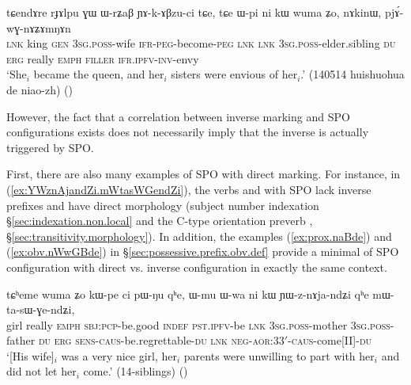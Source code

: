  \begin{exe}
\ex \label{ex:pjAwGnAZAmNAn}
 \gll tɕendɤre rɟɤlpu ɣɯ ɯ-rʑaβ ɲɤ-k-ɤβzu-ci tɕe, tɕe ɯ-pi ni kɯ wuma ʑo, nɤkinɯ, pjɤ́-wɣ-nɤʑɤmŋɤn \\
\textsc{lnk} king \textsc{gen} \textsc{3sg}.\textsc{poss}-wife \textsc{ifr}-\textsc{peg}-become-\textsc{peg} \textsc{lnk} \textsc{lnk} \textsc{3sg}.\textsc{poss}-elder.sibling \textsc{du} \textsc{erg} really \textsc{emph} \textsc{filler} \textsc{ifr}.\textsc{ipfv}-\textsc{inv}-envy \\
\glt `She$_i$ became the queen, and her$_i$ sisters were envious of her$_i$.' (140514 huishuohua de niao-zh)
()
\end{exe}

However, the fact that a correlation between inverse marking and SPO configurations exists does not necessarily imply that the inverse is actually triggered by SPO. 

First, there are also many examples of SPO with direct marking. For instance, in (\ref{ex:YWznAjandZi.mWtasWGendZi}), the verbs  and  with SPO lack inverse prefixes and have direct morphology (subject number indexation §\ref{sec:indexation.non.local} and the C-type orientation preverb , §\ref{sec:transitivity.morphology}). In addition, the examples (\ref{ex:prox.naBde}) and (\ref{ex:obv.nWwGBde}) in §\ref{sec:possessive.prefix.obv.def} provide a minimal of SPO configuration with direct vs. inverse configuration in exactly the same context.

  \begin{exe}
\ex \label{ex:YWznAjandZi.mWtasWGendZi}
 \gll  tɕʰeme wuma ʑo kɯ-pe ci pɯ-ŋu qʰe, ɯ-mu ɯ-wa ni kɯ ɲɯ-z-nɤja-ndʑi qʰe mɯ-ta-sɯ-ɣe-ndʑi, \\
 girl really \textsc{emph} \textsc{sbj}:\textsc{pcp}-be.good \textsc{indef} \textsc{pst}.\textsc{ipfv}-be \textsc{lnk} \textsc{3sg}.\textsc{poss}-mother \textsc{3sg}.\textsc{poss}-father \textsc{du} \textsc{erg} \textsc{sens}-\textsc{caus}-be.regrettable-\textsc{du} \textsc{lnk} \textsc{neg}-\textsc{aor}:3\fl{}3$'$-\textsc{caus}-come[II]-\textsc{du} \\
 \glt `[His wife]$_i$  was a very nice girl, her$_i$ parents were unwilling to part with her$_i$ and did not let her$_i$ come.' (14-siblings)
()
 \end{exe}
 

